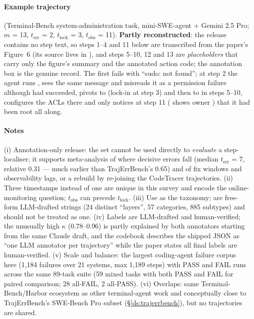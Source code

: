 \paragraph{Example trajectory}  (Terminal-Bench system-administration task, mini-SWE-agent + Gemini 2.5 Pro; $m$ = 13, $t_{\mathrm{err}}$ = 2, $t_{\mathrm{lock}}$ = 3, $t_{\mathrm{obs}}$ = 11). \textbf{Partly reconstructed}: the release contains no step text, so steps 1--4 and 11 below are transcribed from the paper's Figure~6 (its source lives in ), and steps 5--10, 12 and 13 are \emph{placeholders} that carry only the figure's summary and the annotated action code; the annotation box is the genuine record. The first  fails with ``sudo: not found''; at step 2 the agent runs , sees the same message and misreads it as a permission failure although  had succeeded, pivots to  (lock-in at step 3) and then to  in steps 5--10, configures the ACLs there and only notices at step 11 ( shows owner ) that it had been root all along.


\paragraph{Notes} (i) Annotation-only release: the set cannot be used directly to \emph{evaluate} a step-localiser; it supports meta-analysis of where decisive errors fall (median $t_{\mathrm{err}}$ = 7, relative 0.31 --- much earlier than TrajErrBench's 0.65) and of fix windows and observability lags, or a rebuild by re-joining the CodeTracer trajectories. (ii) Three timestamps instead of one are unique in this survey and encode the online-monitoring question; $t_{\mathrm{obs}}$ can precede $t_{\mathrm{lock}}$. (iii) Use  as the taxonomy;  are free-form LLM-drafted strings (24 distinct ``layers'', 57 categories, 885 subtypes) and should not be treated as one. (iv) Labels are LLM-drafted and human-verified; the unusually high $\kappa$ (0.78--0.96) is partly explained by both annotators starting from the same Claude draft, and the codebook describes the shipped JSON as ``one LLM annotator per trajectory'' while the paper states all final labels are human-verified. (v) Scale and balance: the largest coding-agent failure corpus here (1,184 failures over 21 systems, max 1,189 steps) with PASS and FAIL runs across the same 89-task suite (59 mixed tasks with both PASS and FAIL for paired comparison; 28 all-FAIL, 2 all-PASS). (vi) Overlaps: same Terminal-Bench/Harbor ecosystem as other terminal-agent work and conceptually close to TrajErrBench's SWE-Bench Pro subset (\S\ref{ds:trajerrbench}), but no trajectories are shared.
